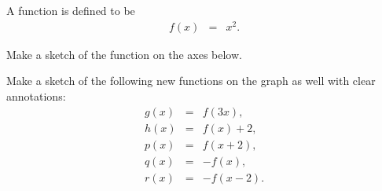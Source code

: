 
\begin{problem}
\item A function is defined to be
  \begin{eqnarray*}
    f(x) & = & x^2.
  \end{eqnarray*}
  \begin{subproblem}
  \item Make a sketch of the function on the axes below.
  \item Make a sketch of the following new functions on the graph as
    well with clear annotations:
    \begin{eqnarray*}
      g(x) & = & f(3x), \\
      h(x) & = & f(x)+2, \\
      p(x) & = & f(x+2), \\
      q(x) & = & -f(x), \\
      r(x) & = & -f(x-2).
    \end{eqnarray*}

    \hspace*{-6em}
    \scalebox{0.95}{}

  \end{subproblem}
\end{problem}


